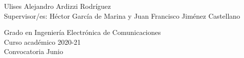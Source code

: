 \begin{center}
   \vspace{1.2cm}

  Ulises Alejandro Ardizzi Rodríguez\\

   \vspace{1.2cm}
  Supervisor/es: Héctor García de Marina y Juan Francisco Jiménez Castellano
  
  \vspace{2cm}
  Grado en Ingeniería Electrónica de Comunicaciones\\
  Curso académico 2020-21\\
  Convocatoria Junio\\



\end{center}




